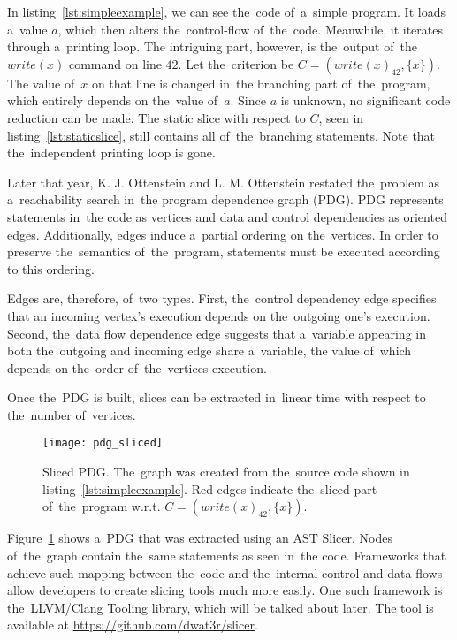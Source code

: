 In listing~\ref{lst:simpleexample}, we can see the~code of~a~simple program.
It loads a~value $a$, which then alters the~control-flow of~the~code.
Meanwhile, it iterates through a~printing loop. 
The intriguing part, however, is the~output of~the~$write(x)$ 
command on line $42$. 
Let the~criterion be $C = (write(x)_{42}, \{x\})$. 
The value of~$x$ on that line is changed in~the branching 
part of~the~program, which entirely depends on the~value of~$a$.
Since $a$ is unknown, no significant code reduction can be made. 
The static slice with respect to $C$, seen in listing~\ref{lst:staticslice}, 
still contains all of~the~branching statements. 
Note that the~independent printing loop is gone.

Later that year, K. J. Ottenstein and L. M. Ottenstein \citep*{Ottenstein84}
restated the~problem as a~reachability
search in~the program dependence graph (PDG).
PDG represents statements in~the code as vertices and data and control
dependencies as oriented edges. 
Additionally, edges induce a~partial ordering on the~vertices. 
In order to preserve the~semantics of~the~program, statements must be executed 
according to this ordering. 

Edges are, therefore, of~two types. 
First, the~control dependency edge specifies that an incoming vertex's 
execution depends on the~outgoing one's execution. 
Second, the~data flow dependence edge suggests that a~variable appearing
in both the~outgoing and incoming edge share a~variable,
the value of~which depends on the~order of~the~vertices execution.

Once the~PDG is built, slices can be extracted in~linear time 
with respect to the~number of~vertices.

\begin{figure}[ht]\centering
\texttt{[image: pdg\_sliced]}
\caption{Sliced PDG. The~graph was created from the~source 
code shown in listing~\ref{lst:simpleexample}.
Red edges indicate the~sliced part of~the~program w.r.t.
$C = (write(x)_{42}, \{x\})$.}
\label{img:pdg}
\end{figure}

Figure~\ref{img:pdg} shows a~PDG that was extracted using an AST Slicer.
Nodes of~the~graph contain the~same statements as seen in~the code.
Frameworks that achieve such mapping between the~code and the~internal
control and data flows allow developers to create slicing tools much 
more easily.
One such framework is the~LLVM/Clang Tooling library, which will be
talked about later.
The tool is available at \url{https://github.com/dwat3r/slicer}.

